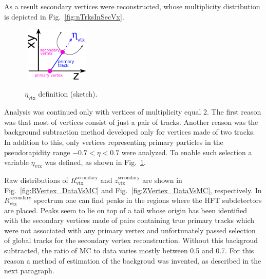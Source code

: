 As a result secondary vertices were reconstructed, whose multiplicity distribution is depicted in Fig.~\ref{fig:nTrksInSecVx}.%
\begin{figure}\vspace*{-5pt}
  \centering
  ~\includegraphics[width=0.265\textwidth]{graphics/deadMaterial/etaVxCut2.pdf}\vspace*{-5pt}
  \caption[$\eta_{\text{vtx}}$ definition (sketch).]{$\eta_{\text{vtx}}$ definition (sketch).}%
   \label{fig:etaVxCut} \vspace*{-9pt}
\end{figure}%
Analysis was continued only with vertices of multiplicity equal 2. The first reason was that most of vertices consist of just a pair of tracks. Another reason was the background subtraction method developed only for vertices made of two tracks. In addition to this, only vertices representing primary particles in the pseudorapidity range $-0.7 < \eta < 0.7$ were analyzed. To enable such selection a variable $\eta_{\text{vtx}}$ was defined, as shown in Fig.~\ref{fig:etaVxCut}.


Raw distributions of $R_{\text{vtx}}^{\text{secondary}}$ and $z_{\text{vtx}}^{\text{secondary}}$ are shown in Fig.~\ref{fig:RVertex_DataVsMC} and Fig.~\ref{fig:ZVertex_DataVsMC}, respectively. In $R_{\text{vtx}}^{\text{secondary}}$ spectrum one can find peaks in the regions where the HFT subdetectors are placed. Peaks seem to lie on top of a tail whose origin has been identified with the secondary vertices made of pairs containing true primary tracks which were not associated with any primary vertex and unfortunately passed selection of global tracks for the secondary vertex reconstruction. Without this backgroud subtracted, the ratio of MC to data varies mostly between 0.5 and 0.7. For this reason a method of estimation of the backgroud was invented, as described in the next paragraph.


